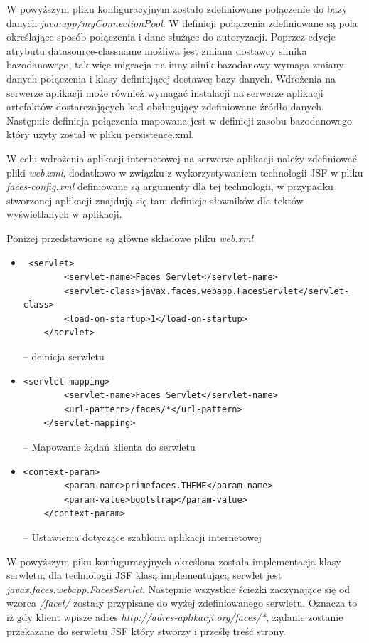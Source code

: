W powyższym pliku konfiguracyjnym zostało zdefiniowane połączenie do bazy danych \textit{java:app/myConnectionPool}. W definicji połączenia zdefiniowane są pola określające sposób połączenia i dane służące do autoryzacji. Poprzez edycje atrybutu datasource-classname możliwa jest zmiana dostawcy silnika bazodanowego, tak więc migracja na inny silnik bazodanowy wymaga zmiany danych połączenia i klasy definiującej dostawcę bazy danych. Wdrożenia na serwerze aplikacji może również wymagać instalacji na serwerze aplikacji artefaktów dostarczających kod obsługujący zdefiniowane źródło danych. Następnie definicja połączenia mapowana jest w definicji zasobu bazodanowego który użyty został w pliku persistence.xml.

W celu wdrożenia aplikacji internetowej na serwerze aplikacji należy zdefiniować pliki \textit{web.xml}, dodatkowo w związku z wykorzystywaniem technologii JSF w pliku \textit{faces-config.xml} definiowane są argumenty dla tej technologii, w przypadku stworzonej aplikacji znajdują się tam definicje słowników dla tektów wyświetlanych w aplikacji.

Poniżej przedstawione są główne składowe pliku \textit{web.xml}

\begin{itemize}
	\item  {\footnotesize \begin{verbatim} <servlet>
        <servlet-name>Faces Servlet</servlet-name>
        <servlet-class>javax.faces.webapp.FacesServlet</servlet-class>
        <load-on-startup>1</load-on-startup>
    </servlet> \end{verbatim}} -- deinicja serwletu
 	\item  {\footnotesize \begin{verbatim}<servlet-mapping>
        <servlet-name>Faces Servlet</servlet-name>
        <url-pattern>/faces/*</url-pattern>
    </servlet-mapping>\end{verbatim}} -- Mapowanie żądań klienta do serwletu
    
    \item  {\footnotesize \begin{verbatim}<context-param>
        <param-name>primefaces.THEME</param-name>
        <param-value>bootstrap</param-value>
    </context-param>\end{verbatim}} -- Ustawienia dotyczące szablonu aplikacji internetowej
\end{itemize}

W powyższym piku konfuguracyjnych określona została implementacja klasy serwletu, dla technologii JSF klasą implementującą serwlet jest \textit{javax.faces.webapp.FacesServlet}. Następnie wszystkie ścieżki zaczynające się od wzorca \textit{/facet/} zostały przypisane do wyżej zdefiniowanego serwletu. Oznacza to iż gdy klient wpisze adres \textit{http://adres-aplikacji.org/faces/*}, żądanie zostanie przekazane do serwletu JSF który stworzy i prześlę treść strony.

